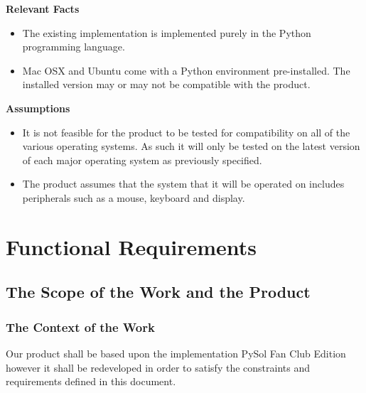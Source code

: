 \documentclass[12pt, titlepage]{article}
\begin{document}
		\textbf{Relevant Facts}
		\vspace{-2mm}
		\begin{itemize}
			\itemsep0em
			\item The existing implementation is implemented purely in 
			the Python programming language.
			\item Mac OSX and Ubuntu come with a Python environment 
			pre-installed. The installed version may or may not be compatible 
			with 
			the product.
		\end{itemize}
		\textbf{Assumptions}
		\vspace{-2mm}
		\begin{itemize}
			\itemsep0em
			\item 	It is not feasible for the product to be tested for 
			compatibility on all of the various operating systems. As such it 
			will only be tested on the latest version of each major operating 
			system as previously specified.
			\item The product assumes that the system that it will be operated 
			on includes peripherals such as a mouse, keyboard and display.
		\end{itemize}
		
	\section{Functional Requirements}
		\subsection{The Scope of the Work and the Product}
		\subsubsection{The Context of the Work}
		\indent Our product shall be based upon the implementation PySol Fan Club
		Edition however it shall be redeveloped in order to satisfy the constraints
		and requirements defined in this document.\\
\end{document}
